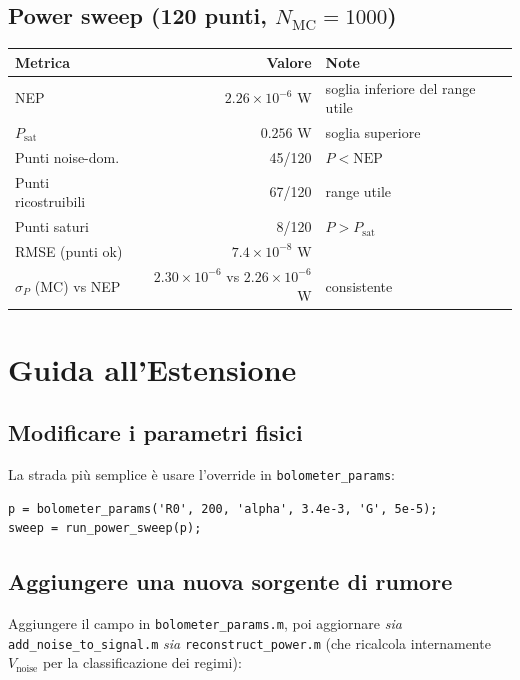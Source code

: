 \documentclass[11pt,a4paper]{article}
\begin{document}
\subsection{Power sweep (120 punti, $N_{\text{MC}} = 1000$)}

\begin{center}
\begin{tabular}{lrl}
\toprule
Metrica & Valore & Note \\
\midrule
NEP & $2.26\times10^{-6}$ W & soglia inferiore del range utile \\
$P_{\text{sat}}$ & $0.256$ W & soglia superiore \\
Punti noise-dom. & 45/120 & $P < \text{NEP}$ \\
Punti ricostruibili & 67/120 & range utile \\
Punti saturi & 8/120 & $P > P_{\text{sat}}$ \\
RMSE (punti ok) & $7.4\times10^{-8}$ W & \\
$\sigma_P$ (MC) vs NEP & $2.30\times10^{-6}$ vs $2.26\times10^{-6}$ W & consistente \\
\bottomrule
\end{tabular}
\end{center}

\section{Guida all'Estensione}

\subsection{Modificare i parametri fisici}

La strada più semplice è usare l'override in \texttt{bolometer\_params}:
\begin{lstlisting}
p = bolometer_params('R0', 200, 'alpha', 3.4e-3, 'G', 5e-5);
sweep = run_power_sweep(p);
\end{lstlisting}

\subsection{Aggiungere una nuova sorgente di rumore}

Aggiungere il campo in \texttt{bolometer\_params.m}, poi aggiornare
\emph{sia} \texttt{add\_noise\_to\_signal.m} \emph{sia}
\texttt{reconstruct\_power.m} (che ricalcola internamente $V_{\text{noise}}$
per la classificazione dei regimi):
\end{document}
